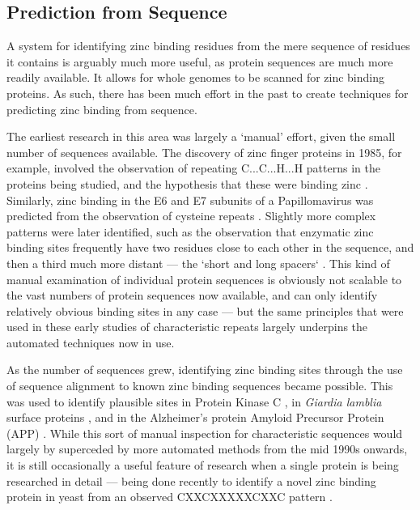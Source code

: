 \subsection{Prediction from Sequence}

A system for identifying zinc binding residues from the mere sequence of residues it contains is arguably much more useful, as protein sequences are much more readily available. It allows for whole genomes to be scanned for zinc binding proteins. As such, there has been much effort in the past to create techniques for predicting zinc binding from sequence.

The earliest research in this area was largely a `manual' effort, given the small number of sequences available. The discovery of zinc finger proteins in 1985, for example, involved the observation of repeating C...C...H...H patterns in the proteins being studied, and the hypothesis that these were binding zinc \cite{miller1985repetitive}. Similarly, zinc binding in the E6 and E7 subunits of a Papillomavirus was predicted from the observation of cysteine repeats \cite{barbosa1989papillomavirus}. Slightly more complex patterns were later identified, such as the observation that enzymatic zinc binding sites frequently have two residues close to each other in the sequence, and then a third much more distant --- the `short and long spacers` \cite{vallee1989short}. This kind of manual examination of individual protein sequences is obviously not scalable to the vast numbers of protein sequences now available, and can only identify relatively obvious binding sites in any case --- but the same principles that were used in these early studies of characteristic repeats largely underpins the automated techniques now in use.

As the number of sequences grew, identifying zinc binding sites through the use of sequence alignment to known zinc binding sequences became possible. This was used to identify plausible sites in Protein Kinase C \cite{bishop1991identification}, in {\it Giardia lamblia} surface proteins \cite{nash1993variant}, and in the Alzheimer's protein Amyloid Precursor Protein (APP) \cite{bush1993novel}. While this sort of manual inspection for characteristic sequences would largely by superceded by more automated methods from the mid 1990s onwards, it is still occasionally a useful feature of research when a single protein is being researched in detail --- being done recently to identify a novel zinc binding protein in yeast from an observed CXXCXXXXXCXXC pattern \cite{furukawa2018identification}.

